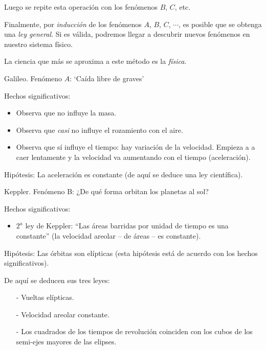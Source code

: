 Luego se repite esta operación con los fenómenos $B$, $C$, etc.

Finalmente, por \emph{inducción} de los fenómenos $A$, $B$, $C$, $\cdots$, es posible que se obtenga una \emph{ley general}. Si es válida, podremos llegar a descubrir nuevos fenómenos en nuestro sistema físico.

La ciencia que más se aproxima a este método es la \emph{física}.

\begin{ejem}{Galileo. Fenómeno $A$: `Caída libre de graves'}

Hechos significativos:
\vspace{-2mm}\begin{itemize}
	\item Observa que no influye la masa.
	\vspace{-2mm}\item Observa que \emph{casi} no influye el rozamiento con el aire.
	\vspace{-2mm}\item Observa que sí influye el tiempo: hay variación de la velocidad. Empieza a a caer lentamente y la velocidad va aumentando con el tiempo (aceleración).
\end{itemize}

Hipótesis: La aceleración es constante (de aquí se deduce una ley científica).
\end{ejem}

\begin{ejem}{Keppler. Fenómeno B: ¿De qué forma orbitan los planetas al sol?}

Hechos significativos:
\begin{itemize}
\vspace{-2mm} \item $2^a$ ley de Keppler: ``Las áreas barridas por unidad de tiempo es una constante'' (la velocidad areolar -- de áreas -- es constante).	
\end{itemize}

Hipótesis: Las órbitas son elípticas (esta hipótesis está de acuerdo con los hechos significativos).

De aquí se deducen sus tres leyes:
\vspace{-2mm}\begin{itemize} 
\vspace{-2mm}\item [-] Vueltas elípticas.
\vspace{-2mm}\item [-] Velocidad areolar constante.
\vspace{-2mm}\item [-] Los cuadrados de los tiempos de revolución coinciden con los cubos de los semi-ejes mayores de las elipses.
\end{itemize}	
\end{ejem}

